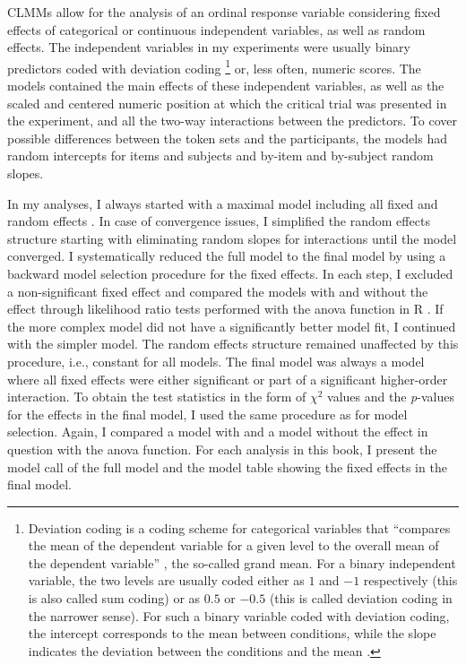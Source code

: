 CLMMs allow for the analysis of an ordinal response variable considering fixed effects of categorical or continuous independent variables, as well as random effects.
The independent variables in my experiments were usually binary predictors coded with deviation coding%
\footnote{Deviation coding is a coding scheme for categorical variables that ``compares the mean of the dependent variable for a given level to the overall mean of the dependent variable'' \citep{coding}, the so-called grand mean.
For a binary independent variable, the two levels are usually coded either as $1$ and $-1$ respectively (this is also called sum coding) or as $0.5$ or $-0.5$ (this is called deviation coding in the narrower sense).
For such a binary variable coded with deviation coding, the intercept corresponds to the mean between conditions, while the slope indicates the deviation between the conditions and the mean \citep{alday2022}.}
%
or, less often, numeric scores.
The models contained the main effects of these independent variables, as well as the scaled and centered numeric position at which the critical trial was presented in the experiment, and all the two-way interactions between the predictors.
To cover possible differences between the token sets and the participants, the models had random intercepts for items and subjects and by-item and by-subject random slopes.

In my analyses, I always started with a maximal model including all fixed and random effects \citep{barr.etal2013}.
In case of convergence issues, I simplified the random effects structure starting with eliminating random slopes for interactions until the model converged.
I systematically reduced the full model to the final model by using a backward model selection procedure for the fixed effects.
In each step, I excluded a non-significant fixed effect and compared the models with and without the effect through likelihood ratio tests performed with the anova function in R \citep{rcoreteam2021}.
If the more complex model did not have a significantly better model fit, I continued with the simpler model.
The random effects structure remained unaffected by this procedure, i.e., constant for all models.
The final model was always a model where all fixed effects were either significant or part of a significant higher-order interaction.
To obtain the test statistics in the form of $\chi^2$ values and the \textit{p}-values for the effects in the final model, I used the same procedure as for model selection.
Again, I compared a model with and a model without the effect in question with the anova function.
For each analysis in this book, I present the model call of the full model and the model table showing the fixed effects in the final model.

